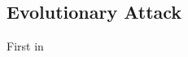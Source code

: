 \documentclass{article}
\begin{document}
\subsection{Evolutionary Attack}
First in \cite{DBLP:journals/corr/NguyenYC14}








%
%
\end{document}

